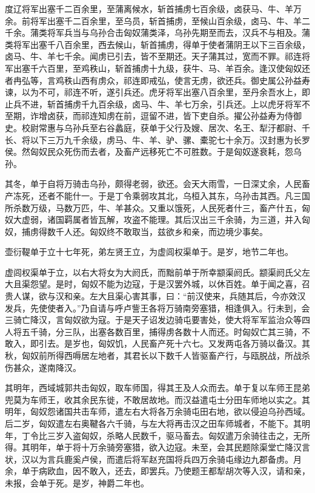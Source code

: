 \documentclass[]{article}
\begin{document}
度辽将军出塞千二百余里，至蒲离候水，斩首捕虏七百余级，卤获马、牛、羊万余。前将军出塞千二百余里，至乌员，斩首捕虏，至候山百余级，卤马、牛、羊二千余。蒲类将军兵当与乌孙合击匈奴蒲类泽，乌孙先期至而去，汉兵不与相及。蒲类将军出塞千八百余里，西去候山，斩首捕虏，得单于使者蒲阴王以下三百余级，卤马、牛、羊七千余。闻虏已引去，皆不至期还。天子蒲其过，宽而不罪。祁连将军出塞千六百里，至鸡秩山，斩首捕虏十九级，获牛、马、羊百余。逢汉使匈奴还者冉弘等，言鸡秩山西有虏众，祁连即戒弘，使言无虏，欲还兵。御史属公孙益寿谏，以为不可，祁连不听，遂引兵还。虎牙将军出塞八百余里，至丹余吾水上，即止兵不进，斩首捕虏千九百余级，卤马、牛、羊七万余，引兵还。上以虎牙将军不至期，诈增卤获，而祁连知虏在前，逗留不进，皆下吏自杀。擢公孙益寿为侍御史。校尉常惠与乌孙兵至右谷蠡庭，获单于父行及嫂、居次、名王、犁汙都尉、千长、将以下三万九千余级，虏马、牛、羊、驴、骡、橐驼七十余万。汉封惠为长罗侯。然匈奴民众死伤而去者，及畜产远移死亡不可胜数。于是匈奴遂衰耗，怨乌孙。

其冬，单于自将万骑击乌孙，颇得老弱，欲还。会天大雨雪，一日深丈余，人民畜产冻死，还者不能什一。于是丁令乘弱攻其北，乌桓入其东，乌孙击其西。凡三国所杀数万级，马数万匹，牛、羊甚众。又重以饿死，人民死者什三，畜产什五，匈奴大虚弱，诸国羁属者皆瓦解，攻盗不能理。其后汉出三千余骑，为三道，并入匈奴，捕虏得数千人还。匈奴终不敢取当，兹欲乡和亲，而边境少事矣。

壶衍鞮单于立十七年死，弟左贤王立，为虚闾权渠单于。是岁，地节二年也。

虚闾权渠单于立，以右大将女为大阏氏，而黜前单于所幸颛渠阏氏。颛渠阏氏父左大且渠怨望。是时，匈奴不能为边寇，于是汉罢外城，以休百姓。单于闻之喜，召贵人谋，欲与汉和亲。左大且渠心害其事，曰：``前汉使来，兵随其后，今亦效汉发兵，先使使者入。''乃自请与呼卢訾王各将万骑南旁塞猎，相逢俱入。行未到，会三骑亡降汉，言匈奴欲为寇。于是天子诏发边骑屯要害处，使大将军军监治众等四人将五千骑，分三队，出塞各数百里，捕得虏各数十人而还。时匈奴亡其三骑，不敢入，即引去。是岁也，匈奴饥，人民畜产死十六七。又发两屯各万骑以备汉。其秋，匈奴前所得西嗕居左地者，其君长以下数千人皆驱畜产行，与瓯脱战，所战杀伤甚众，遂南降汉。

其明年，西域城郭共击匈奴，取车师国，得其王及人众而去。单于复以车师王昆弟兜莫为车师王，收其余民东徙，不敢居故地。而汉益遣屯士分田车师地以实之。其明年，匈奴怨诸国共击车师，遣左右大将各万余骑屯田右地，欲以侵迫乌孙西域。后二岁，匈奴遣左右奥鞬各六千骑，与左大将再击汉之田车师城者，不能下。其明年，丁令比三岁入盗匈奴，杀略人民数千，驱马畜去。匈奴遣万余骑往击之，无所得。其明年，单于将十万余骑旁塞猎，欲入边寇。未至，会其民题除渠堂亡降汉言状，汉以为言兵鹿奚卢侯，而遣后将军赵充国将兵四万余骑屯缘边九郡备虏。月余，单于病欧血，因不敢入，还去，即罢兵。乃使题王都犁胡次等入汉，请和亲，未报，会单于死。是岁，神爵二年也。
\end{document}
